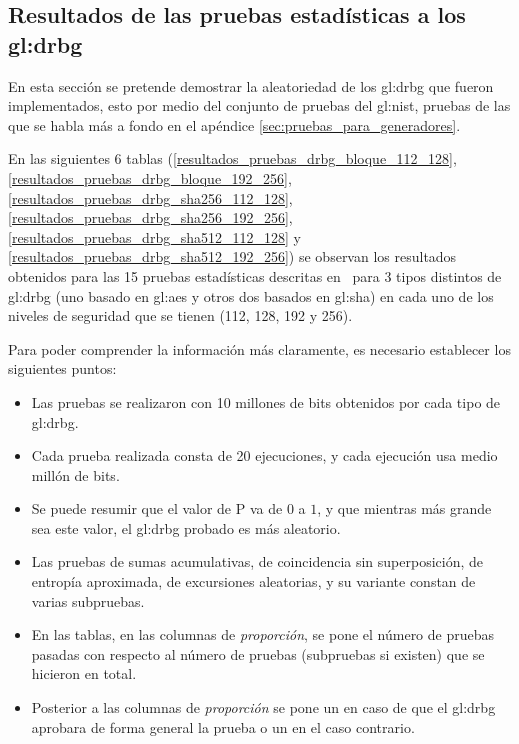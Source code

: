 %
%

\subsection{Resultados de las pruebas estadísticas a los %
  \texorpdfstring{\acrshort{gl:drbg}}{DRBG}}
\label{sec:resultados_pruebas_estadisticas_drgb}

En esta sección se pretende demostrar la aleatoriedad de los \gls{gl:drbg}
que fueron implementados, esto por medio del conjunto de pruebas del
\gls{gl:nist}, pruebas de las que se habla más a fondo en el apéndice
\ref{sec:pruebas_para_generadores}.

En las siguientes 6 tablas
(\ref{resultados_pruebas_drbg_bloque_112_128},
\ref{resultados_pruebas_drbg_bloque_192_256},
\ref{resultados_pruebas_drbg_sha256_112_128},
\ref{resultados_pruebas_drbg_sha256_192_256},
\ref{resultados_pruebas_drbg_sha512_112_128} y
\ref{resultados_pruebas_drbg_sha512_192_256})
se observan los resultados obtenidos para las 15 pruebas estadísticas
descritas en~\cite{nist_pruebas} para 3 tipos distintos de \gls{gl:drbg}
(uno basado en \gls{gl:aes} y otros dos basados en \gls{gl:sha}) en cada
uno de los niveles de seguridad que se tienen (112, 128, 192 y 256).

Para poder comprender la información más claramente, es necesario establecer
los siguientes puntos:

\begin{itemize}

  \item Las pruebas se realizaron con 10 millones de bits obtenidos por cada
    tipo de \gls{gl:drbg}.

  \item Cada prueba realizada consta de 20 ejecuciones, y cada ejecución usa
    medio millón de bits.

  \item Se puede resumir que el valor de P va de $0$ a $1$, y que mientras
    más grande sea este valor, el \gls{gl:drbg} probado es más aleatorio.

  \item Las pruebas de sumas acumulativas, de coincidencia sin superposición,
    de entropía aproximada, de excursiones aleatorias, y su variante constan
    de varias subpruebas.

  \item En las tablas, en las columnas de \textit{proporción}, se pone el
    número de pruebas pasadas con respecto al número de pruebas (subpruebas
    si existen) que se hicieron en total.

  \item Posterior a las columnas de \textit{proporción} se pone un 
    en caso de que el \gls{gl:drbg} aprobara de forma general la prueba o un
     en el caso contrario.

\end{itemize}

